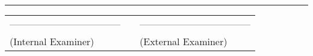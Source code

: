\hrule
\vspace{.8cm}
{ \par }
\vspace{1.5cm}
\begin{table}[H]
    \begin{center}
\begin{tabular}{lcl}
    \noindent ----------------------------------- &\hspace{1cm}&  ----------------------------------- \\
    (Internal Examiner) & \hspace{3cm} &   (External Examiner) \\
\end{tabular}
\end{center}
\end{table}
    \clearpage
